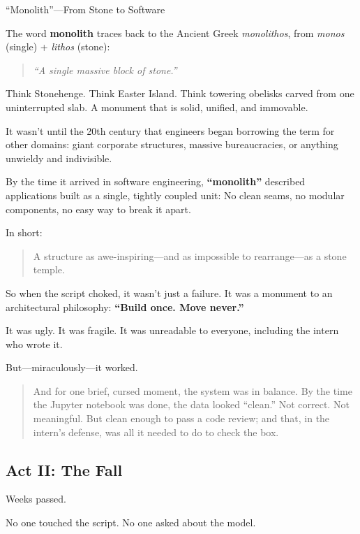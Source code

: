\begin{HistoricalSidebar}{“Monolith”—From Stone to Software}

The word \textbf{monolith} traces back to the Ancient Greek \textit{monolithos}, from \textit{monos} (single) + \textit{lithos} (stone):  
\begin{quote}
\textit{“A single massive block of stone.”}
\end{quote}

Think Stonehenge. Think Easter Island. Think towering obelisks carved from one uninterrupted slab.  
A monument that is solid, unified, and immovable.

It wasn’t until the 20th century that engineers began borrowing the term for other domains: giant corporate structures, massive bureaucracies, or anything unwieldy and indivisible.

By the time it arrived in software engineering, \textbf{“monolith”} described applications built as a single, tightly coupled unit:  
No clean seams, no modular components, no easy way to break it apart.

In short:  
\begin{quote}
A structure as awe-inspiring—and as impossible to rearrange—as a stone temple.
\end{quote}

So when the script choked, it wasn’t just a failure.  
It was a monument to an architectural philosophy:  
\textbf{“Build once. Move never.”}
\end{HistoricalSidebar}


It was ugly. It was fragile. It was unreadable to everyone, including the intern who wrote it.

But—miraculously—it worked.

\begin{quote}
And for one brief, cursed moment, the system was in balance.
By the time the Jupyter notebook was done, the data looked “clean.”  
Not correct. Not meaningful. But clean enough to pass a code review;  
and that, in the intern’s defense, was all it needed to do to check the box.
\end{quote}




\subsection{Act II: The Fall}

Weeks passed.

No one touched the script. No one asked about the model.

